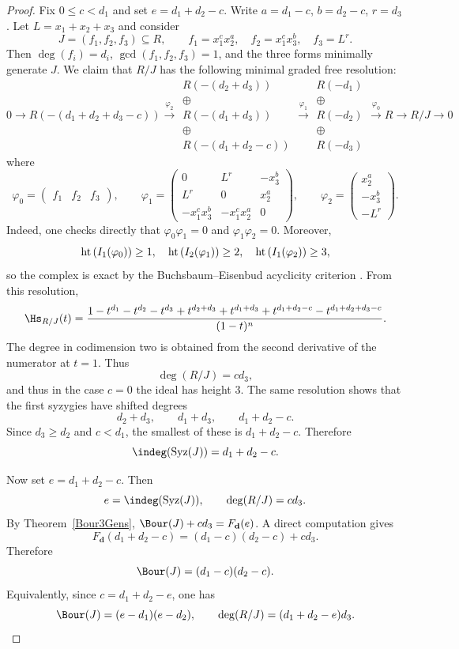 \documentclass[11pt]{amsart} %
\theoremstyle{definition}
\def\phi{\varphi}
\def\hht{{\rm ht}\,}
\def\syz{\mbox{\rm Syz}}
\def\phi{\varphi}
\def\hht{{\rm ht}\,}
\def\R{{\mathcal R}}
\begin{document}
\begin{proof}
Fix $0\le c<d_1$ and set $e=d_1+d_2-c$. Write
$a=d_1-c$, $b=d_2-c$, $r=d_3$. Let $L=x_1+x_2+x_3$ and consider
\[
J=(f_1,f_2,f_3)\subseteq R,\qquad
f_1=x_1^cx_2^a,\quad f_2=x_1^cx_3^b,\quad f_3=L^r.
\]
Then $\deg(f_i)=d_i$, $\gcd(f_1,f_2,f_3)=1$, and the three forms minimally
generate $J$. We claim that $R/J$ has the following minimal graded free resolution:
\begin{equation}\label{res-initial}
0\to R(-(d_1+d_2+d_3-c))\stackrel{\phi_2}\longrightarrow\begin{matrix} R(-(d_2+d_3))\\\oplus \\R(-(d_1+d_3))\\\oplus \\R(-(d_1+d_2-c))\end{matrix}\stackrel{\phi_1}\longrightarrow\begin{matrix}R(-d_1)\\\oplus\\ R(-d_2)\\\oplus\\ R(-d_3)\end{matrix}\stackrel{\phi_0}\longrightarrow R\to R/J\to0	
\end{equation}
where
\[
\phi_0=\begin{pmatrix}f_1&f_2&f_3\end{pmatrix}, \qquad \phi_1=
\begin{pmatrix}
0 & L^r & -x_3^b\\
 L^r & 0 & x_2^a\\
-x_1^cx_3^b & -x_1^cx_2^a & 0
\end{pmatrix},
\qquad
\phi_2=
\begin{pmatrix}
x_2^a\\
-x_3^b\\
- L^r
\end{pmatrix}.
\]
Indeed, one checks directly that $\phi_0\phi_1=0$ and $\phi_1\phi_2=0$. Moreover, 
$$
\hht(I_1(\varphi_0)) \geq 1, \quad \hht(I_2(\varphi_1)) \geq 2, \quad \hht(I_1(\varphi_2)) \geq 3,
$$
so the complex is exact by the Buchsbaum--Eisenbud acyclicity criterion
\cite[Theorem~1.4.13]{bruns1998cohen}.
From this resolution,
\[
\Hs_{R/J}(t)=
\frac{
1-t^{d_1}-t^{d_2}-t^{d_3}
+t^{d_2+d_3}+t^{d_1+d_3}+t^{d_1+d_2-c}
-t^{d_1+d_2+d_3-c}
}{(1-t)^n}.
\]
The degree in codimension two is obtained from the second derivative of the numerator
at $t=1$. Thus
\[
\deg(R/J)=cd_3,
\]
and thus in the case $c = 0$ the ideal has height $3$.
The same resolution shows that the first syzygies have shifted degrees
\[
d_2+d_3,\qquad d_1+d_3,\qquad d_1+d_2-c.
\]
Since $d_3\ge d_2$ and $c<d_1$, the smallest of these is
$d_1+d_2-c$. Therefore
\[
\indeg(\syz(J))=d_1+d_2-c.
\]

Now set $e=d_1+d_2-c$. Then
\[
e=\indeg(\syz(J)),\qquad \deg(R/J)=cd_3.
\]
By Theorem~\ref{Bour3Gens},
$\Bour(J)+cd_3=F_{\mathbf d}(e)$. A direct computation gives
\[
F_{\mathbf d}(d_1+d_2-c)=(d_1-c)(d_2-c)+cd_3.
\]
Therefore
\[
\Bour(J)=(d_1-c)(d_2-c).
\]
Equivalently, since $c=d_1+d_2-e$, one has
\[
\Bour(J)=(e-d_1)(e-d_2),
\qquad
\deg(R/J)=(d_1+d_2-e)d_3.
\]
\end{proof}
\end{document}
